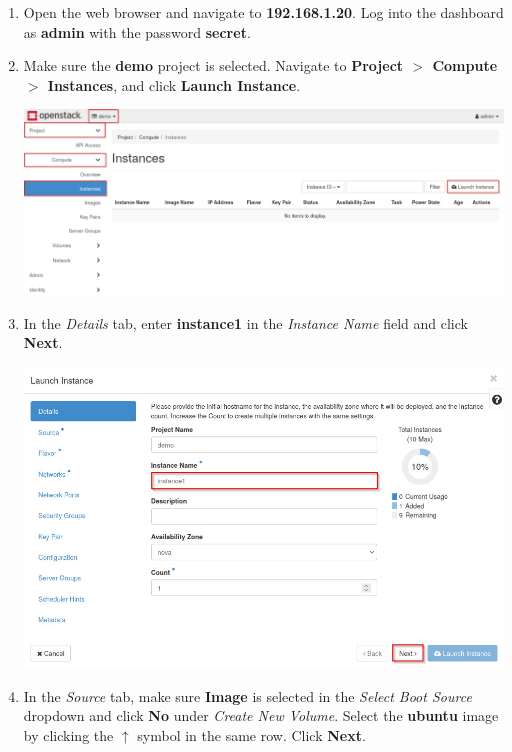 \documentclass[letterpaper, 12pt]{article}
\begin{document}
\begin{enumerate}
    \item Open the web browser and navigate to \textbf{192.168.1.20}. Log into the dashboard as \textbf{admin} with the
    password \textbf{secret}.

    \item Make sure the \textbf{demo} project is selected. Navigate to \textbf{Project $>$ Compute $>$ Instances},
    and click \textbf{Launch Instance}.

    \begin{center}
        \includegraphics[width=\linewidth]{images/part2/step2.png}
    \end{center}

    \item In the \textit{Details} tab, enter \textbf{instance1} in the \textit{Instance Name} field and click
    \textbf{Next}.

    \begin{center}
        \includegraphics[width=\linewidth]{images/part2/step3.png}
    \end{center}

    \item In the \textit{Source} tab, make sure \textbf{Image} is selected in the \textit{Select Boot Source} dropdown
    and click \textbf{No} under \textit{Create New Volume}. Select the \textbf{ubuntu} image by clicking the $\uparrow$
    symbol in the same row. Click \textbf{Next}.


\end{enumerate}
\end{document}
